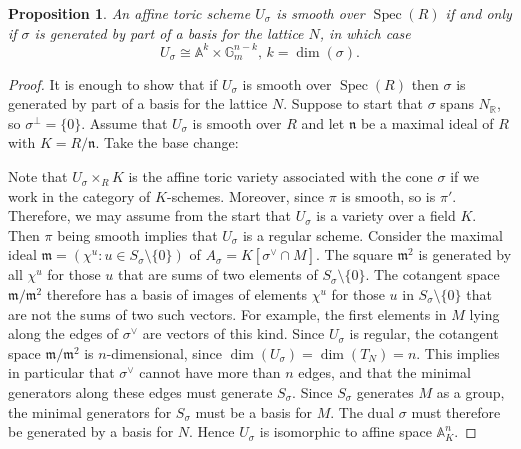 \documentclass[10pt,a4paper]{book}
\newtheorem*{prop*}{Proposition}
\newcommand{\on}{\operatorname}
\newcommand{\s}{\on{Spec}}
\newcommand{\mf}{\mathfrak}
\begin{document}
\begin{prop*} An affine toric scheme $U_\sigma$ is smooth over $\s (R)$ if and only if $\sigma$ is generated by part of a basis for the lattice $N$, in which case
\[
U_\sigma \cong \mathbb{A}^k\times \mathbb{G}_m^{n-k} \text{, } k =\on{dim}(\sigma).
\]
\end{prop*}
\begin{proof}
It is enough to show that if $U_\sigma$ is smooth over $\s (R)$ then $\sigma$ is generated by part of a basis for the lattice $N$. Suppose to start that $\sigma$ spans $N_\mathbb{R}$, so $\sigma^\perp = \{0\}$. Assume that $U_\sigma$ is smooth over $R$ and let $\mf{n}$ be a maximal ideal of $R$ with $K=R/\mf{n}$. Take the base change:
\begin{center}
\end{center}
Note that $U_\sigma \times_R K$ is the affine toric variety associated with the cone $\sigma$ if we work in the category of $K$-schemes. Moreover, since $\pi$ is smooth, so is $\pi'$. Therefore, we may assume from the start that $U_\sigma$ is a variety over a field $K$. Then $\pi$ being smooth implies that $U_\sigma$ is a regular scheme. Consider the maximal ideal $\mf{m} = (\chi^u:u\in S_\sigma\setminus \{0\})$ of $A_\sigma = K[\sigma^\vee\cap M]$. The square $\mf{m}^2$ is generated by all $\chi^u$ for those $u$ that are sums of two elements of $S_\sigma\setminus \{0\}$. The cotangent space $\mf{m}/\mf{m}^2$ therefore has a basis of images of elements $\chi^u$ for
those $u$ in $S_\sigma \setminus \{0\}$ that are not the sums of two such vectors. For
example, the first elements in $M$ lying along the edges of $\sigma^\vee$ are vectors of this kind. Since $U_\sigma$ is regular, 
the cotangent space $\mf{m}/\mf{m}^2$ is $n$-dimensional, since $\on{dim}(U_\sigma) = \on{dim}(T_N) = n.$ This implies in particular that $\sigma^\vee$ cannot have more than $n$ edges, and that the
minimal generators along these edges must generate $S_\sigma$. Since $S_\sigma$ generates $M$ as a group, the minimal generators for $S_\sigma$ must be a basis for $M$. The dual $\sigma$ must therefore be generated by a basis for $N$. Hence $U_\sigma$ is isomorphic to affine space $\mathbb{A}^n_K$.


\end{proof}
\end{document}
